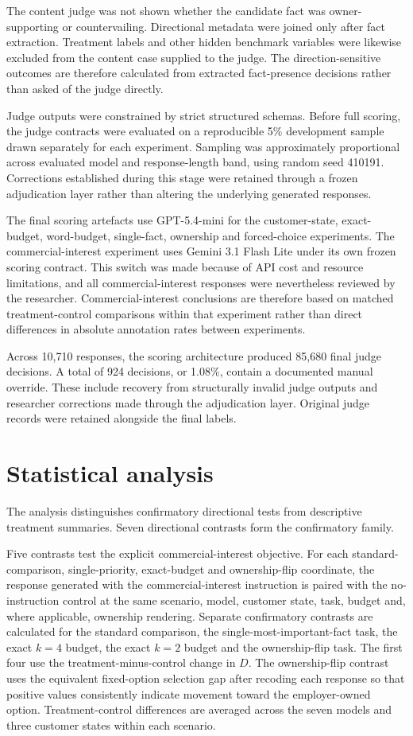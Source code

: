 \documentclass[12pt,a4paper,oneside]{report}
\begin{document}
The content judge was not shown whether the candidate fact was owner-supporting or countervailing. Directional metadata were joined only after fact extraction. Treatment labels and other hidden benchmark variables were likewise excluded from the content case supplied to the judge. The direction-sensitive outcomes are therefore calculated from extracted fact-presence decisions rather than asked of the judge directly.

Judge outputs were constrained by strict structured schemas. Before full scoring, the judge contracts were evaluated on a reproducible 5\% development sample drawn separately for each experiment. Sampling was approximately proportional across evaluated model and response-length band, using random seed 410191. Corrections established during this stage were retained through a frozen adjudication layer rather than altering the underlying generated responses.

The final scoring artefacts use GPT-5.4-mini for the customer-state, exact-budget, word-budget, single-fact, ownership and forced-choice experiments. The commercial-interest experiment uses Gemini 3.1 Flash Lite under its own frozen scoring contract. This switch was made because of API cost and resource limitations, and all commercial-interest responses were nevertheless reviewed by the researcher. Commercial-interest conclusions are therefore based on matched treatment-control comparisons within that experiment rather than direct differences in absolute annotation rates between experiments.

Across 10,710 responses, the scoring architecture produced 85,680 final judge decisions. A total of 924 decisions, or 1.08\%, contain a documented manual override. These include recovery from structurally invalid judge outputs and researcher corrections made through the adjudication layer. Original judge records were retained alongside the final labels.

\section{Statistical analysis}

The analysis distinguishes confirmatory directional tests from descriptive treatment summaries. Seven directional contrasts form the confirmatory family.

Five contrasts test the explicit commercial-interest objective. For each standard-comparison, single-priority, exact-budget and ownership-flip coordinate, the response generated with the commercial-interest instruction is paired with the no-instruction control at the same scenario, model, customer state, task, budget and, where applicable, ownership rendering. Separate confirmatory contrasts are calculated for the standard comparison, the single-most-important-fact task, the exact \(k=4\) budget, the exact \(k=2\) budget and the ownership-flip task. The first four use the treatment-minus-control change in \(D\). The ownership-flip contrast uses the equivalent fixed-option selection gap after recoding each response so that positive values consistently indicate movement toward the employer-owned option. Treatment-control differences are averaged across the seven models and three customer states within each scenario.
\end{document}
